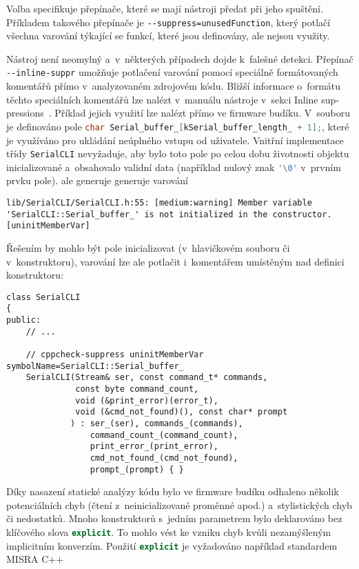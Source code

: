 Volba  specifikuje přepínače, které se mají nástroji
 předat při jeho spuštění. Příkladem takového přepínače je
\verb|--suppress=unusedFunction|, který potlačí všechna varování týkající se
funkcí, které jsou definovány, ale nejsou využity.

Nástroj není neomylný a~v~některých případech dojde k~falešné detekci. Přepínač
\verb|--inline-suppr| umožňuje potlačení varování pomocí speciálně
formátovaných komentářů přímo v~analyzovaném zdrojovém kódu. Bližší informace
o~formátu těchto speciálních komentářů lze nalézt v~manuálu nástroje
v~sekci \foreignlanguage{english}{Inline suppressions}~\cite{cppcheckmanual}.
Příklad jejich využití lze nalézt přímo ve firmware budíku.
V~souboru  je definováno pole
\lstinline[language=C]!char Serial_buffer_[kSerial_buffer_length_ + 1];!,
které je využíváno pro ukládání neúplného vstupu od uživatele. Vnitřní
implementace třídy \texttt{SerialCLI} nevyžaduje, aby bylo toto pole po celou
dobu životnosti objektu inicializované a~obsahovalo validní data (například
nulový znak \lstinline[language=C]!'\0'! v~prvním prvku pole).
 ale generuje generuje varování
\begin{lstlisting}[style=terminal,breakatwhitespace=true]
lib/SerialCLI/SerialCLI.h:55: [medium:warning] Member variable 'SerialCLI::Serial_buffer_' is not initialized in the constructor. [uninitMemberVar]
\end{lstlisting}
Řešením by mohlo být pole inicializovat (v~hlavičkovém souboru či
v~konstruktoru), varování lze ale potlačit i~komentářem umístěným nad definici
konstruktoru:
\begin{lstlisting}[language=myC++]
class SerialCLI
{
public:
    // ...

    // cppcheck-suppress uninitMemberVar symbolName=SerialCLI::Serial_buffer_
    SerialCLI(Stream& ser, const command_t* commands,
              const byte command_count,
              void (&print_error)(error_t),
              void (&cmd_not_found)(), const char* prompt
             ) : ser_(ser), commands_(commands),
                 command_count_(command_count),
                 print_error_(print_error),
                 cmd_not_found_(cmd_not_found),
                 prompt_(prompt) { }
\end{lstlisting}


Díky nasazení statické analýzy kódu bylo ve firmware budíku odhaleno několik
potenciálních chyb (čtení z~neinicializované proměnné apod.) a~stylistických
chyb či nedostatků. Mnoho konstruktorů s~jedním parametrem bylo deklarováno bez
klíčového slova \lstinline[language=C++]!explicit!. To mohlo vést ke vzniku
chyb kvůli nezamýšleným implicitním konverzím. Použití
\lstinline[language=C++]!explicit! je vyžadováno například standardem
MISRA C++~\cite[pravidlo 12-1-3]{MISRAC++2008}

